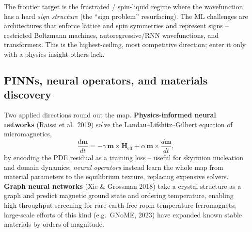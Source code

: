 \documentclass[11pt]{article}
\begin{document}
\begin{center}
\end{center}
\noindent The frontier target is the frustrated / spin-liquid regime where the wavefunction
has a hard \emph{sign structure} (the ``sign problem'' resurfacing). The ML challenges are
architectures that enforce lattice and spin symmetries and represent signs -- restricted
Boltzmann machines, autoregressive/RNN wavefunctions, and transformers. This is the
highest-ceiling, most competitive direction; enter it only with a physics insight others
lack.

\subsection{PINNs, neural operators, and materials discovery}
Two applied directions round out the map. \textbf{Physics-informed neural networks} (Raissi
et al.\ 2019) solve the Landau--Lifshitz--Gilbert equation of micromagnetics,
\begin{equation}
\frac{d\mathbf{m}}{dt}=-\gamma\,\mathbf{m}\times\mathbf{H}_{\mathrm{eff}}
+\alpha\,\mathbf{m}\times\frac{d\mathbf{m}}{dt},
\end{equation}
by encoding the PDE residual as a training loss -- useful for skyrmion nucleation and
domain dynamics; \emph{neural operators} instead learn the whole map from material
parameters to the equilibrium texture, replacing expensive solvers. \textbf{Graph neural
networks} (Xie \& Grossman 2018) take a crystal structure as a graph and predict magnetic
ground state and ordering temperature, enabling high-throughput screening for
rare-earth-free room-temperature ferromagnets; large-scale efforts of this kind (e.g.\
GNoME, 2023) have expanded known stable materials by orders of magnitude.
\end{document}
